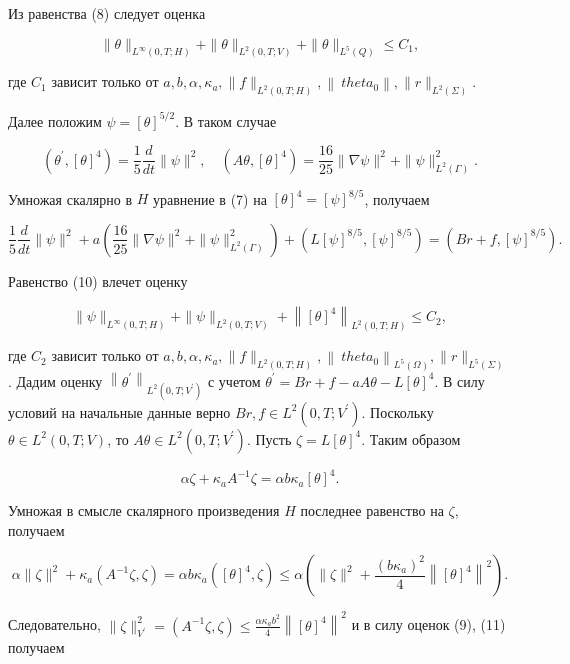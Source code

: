 Из равенства (8) следует оценка

\[
\|\theta\|_{L^{\infty}(0, T ; H)}+\|\theta\|_{L^{2}(0, T ; V)}+\|\theta\|_{L^{5}(Q)} \leq C_{1},
\]

где $C_{1}$ зависит только от $a, b, \alpha, \kappa_{a},\|f\|_{L^{2}(0, T ; H)},
\left\|\ theta_{0}\right\|,\|r\|_{L^{2}(\Sigma)}$.

Далее положим $\psi=[\theta]^{5 / 2}$.
В таком случае

\[
\left(\theta^{\prime},[\theta]^{4}\right)=\frac{1}{5} \frac{d}{d t}\|\psi\|^{2},
\quad\left(A \theta,[\theta]^{4}\right)=\frac{16}{25}\|\nabla \psi\|^{2}+\|\psi\|_{L^{2}(\Gamma)}^{2}.
\]

Умножая скалярно в $H$ уравнение в (7) на $[\theta]^{4}=[\psi]^{8 / 5}$, получаем

\[
\frac{1}{5} \frac{d}{d t}\|\psi\|^{2}+a\left(\frac{16}{25}\|\nabla \psi\|^{2}+
\|\psi\|_{L^{2}(\Gamma)}^{2}\right)+\left(L[\psi]^{8 / 5},[\psi]^{8 / 5}\right)=\left(B r+f,[\psi]^{8 / 5}\right).
\]

Равенство (10) влечет оценку

\[
\|\psi\|_{L^{\infty}(0, T ; H)}+\|\psi\|_{L^{2}(0, T ; V)}+
\left\|[\theta]^{4}\right\|_{L^{2}(0, T ; H)} \leq C_{2},
\]

где $C_{2}$ зависит только от $a, b, \alpha, \kappa_{a},\|f\|_{L^{2}(0, T ; H)},
\left\|\ theta_{0}\right\|_{L^{5}(\Omega)},\|r\|_{L^{5}(\Sigma)}$.
Дадим оценку $\left\|\theta^{\prime}\right\|_{L^{2}\left(0, T ; V^{\prime}\right)}$
с учетом $ \theta^{\prime}=B r+f-a A \theta-L[\theta]^{4}$.
В силу условий на начальные данные верно $B r, f \in L^{2}\left(0, T ; V^{\prime}\right)$.
Поскольку $\theta \in L^{2}(0, T ; V)$, то $A \theta \in L^{2}\left(0, T ; V^{\prime}\right)$.
Пусть $\zeta=L[\theta]^{4}$.
Таким образом

\[
\alpha \zeta+\kappa_{a} A^{-1} \zeta=\alpha b \kappa_{a}[\theta]^{4}.
\]


Умножая в смысле скалярного произведения $H$ последнее равенство на $\zeta$, получаем

\[
\alpha\|\zeta\|^{2}+\kappa_{a}\left(A^{-1} \zeta,
\zeta\right)=\alpha b \kappa_{a}\left([\theta]^{4},
\zeta\right) \leq \alpha\left(\|\zeta\|^{2}+\frac{\left(b \kappa_{a}\right)^{2}}{4}\left\|
[\theta]^{4}\right\|^{2}\right).
\]


Следовательно, $\|\zeta\|_{V^{\prime}}^{2}=\left(A^{-1} \zeta,
\zeta\right) \leq \frac{\alpha \kappa_{ a} b^{2}}{4}\left\|[\theta]^{4}\right\|^{2}$
и в силу оценок (9), (11) получаем

